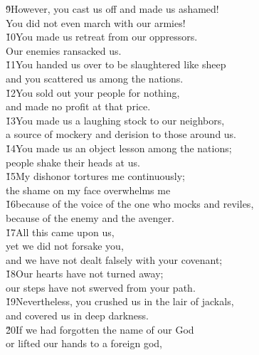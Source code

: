 \begin{poetry}
\poeml \v{9}However, you cast us off and made us ashamed! \\
\poemll    You did not even march with our armies! \\
\poeml \v{10}You made us retreat from our oppressors. \\
\poemll    Our enemies ransacked us. \\
\poeml \v{11}You handed us over to be slaughtered like sheep \\
\poemll    and you scattered us among the nations. \\
\poeml \v{12}You sold out your people for nothing, \\
\poemll    and made no profit at that price. \\
\poeml \v{13}You made us a laughing stock to our neighbors, \\
\poemll    a source of mockery and derision to those around us. \\
\poeml \v{14}You made us an object lesson among the nations; \\
\poemll    people shake their heads at us. \\
\poeml \v{15}My dishonor tortures me continuously; \\
\poemll    the shame on my face overwhelms me \\
\poeml \v{16}because of the voice of the one who mocks and reviles, \\
\poemll    because of the enemy and the avenger. \\
\poeml \v{17}All this came upon us, \\
\poemll    yet we did not forsake you, \\
\poemlll       and we have not dealt falsely with your covenant; \\
\poeml \v{18}Our hearts have not turned away; \\
\poemll    our steps have not swerved from your path. \\
\poeml \v{19}Nevertheless, you crushed us in the lair of jackals, \\
\poemll    and covered us in deep darkness. \\
\poeml \v{20}If we had forgotten the name of our God \\
\poemll    or lifted our hands to a foreign god, \\

\end{poetry}
